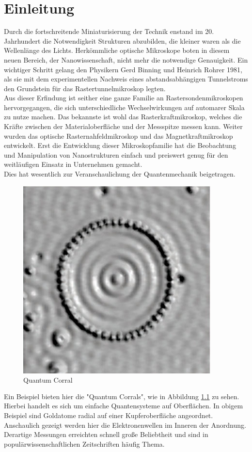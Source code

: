 \chapter{Einleitung}

Durch die fortschreitende Miniaturisierung der Technik enstand im 20. Jahrhundert
die Notwendigkeit Strukturen abzubilden, die kleiner waren als die Wellenlänge des
Lichts. Herkömmliche optische Mikroskope boten in diesem neuen Bereich, der 
Nanowissenschaft, nicht mehr die notwendige Genauigkeit. Ein wichtiger Schritt
gelang den Physikern Gerd Binning und Heinrich Rohrer 1981, als sie mit dem 
experimentellen Nachweis eines abstandsabhängigen Tunnelstroms den Grundstein für
das Rastertunnelmikroskop legten.\\
Aus dieser Erfindung ist seither eine ganze Familie an Rastersondenmikroskopen
hervorgegangen, die sich unterschiedliche Wechselwirkungen auf automarer Skala
zu nutze machen. Das bekannste ist wohl das Rasterkraftmikroskop, welches die 
Kräfte zwischen der Materialoberfläche und der Messspitze messen kann. Weiter
wurden das optische Rasternahfeldmikroskop und das Magnetkraftmikroskop entwickelt.
Erst die Entwicklung dieser Mikroskopfamilie hat die Beobachtung und Manipulation
von Nanostrukturen einfach und preiswert genug für den weitläufigen Einsatz in 
Unternehmen gemacht.\\
Dies hat wesentlich zur Veranschaulichung der Quantenmechanik beigetragen.
\begin{figure}
    \includegraphics[scale=1.25]{Abb/quant.jpg}
    \caption{Quantum Corral \cite{corral}}
    \label{qucorr}
\end{figure}
Ein Beispiel bieten hier die "Quantum Corrals", wie in Abbildung \ref{qucorr} zu
sehen. Hierbei handelt es sich um einfache Quantensysteme auf Oberflächen. In obigem
Beispiel sind Goldatome radial auf einer Kupferoberfläche angeordnet. Anschaulich
gezeigt werden hier die Elektronenwellen im Inneren der Anordnung.
Derartige Messungen erreichten schnell große Beliebtheit und sind in 
populärwissenschaftlichen Zeitschriften häufig Thema. 
\cite{rasterwiki}
% 
